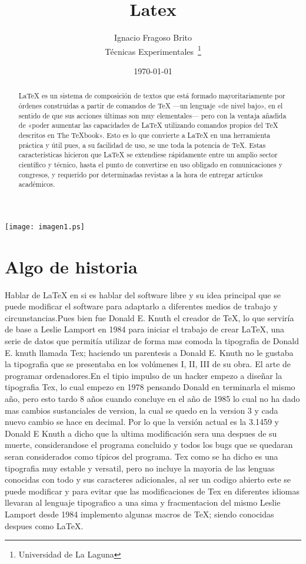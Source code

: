 \documentclass[a4paper,12pt]{article}
\begin{document}
\title{Latex}
\author{Ignacio Fragoso Brito\\
	Técnicas Experimentales~\footnote{Universidad de La Laguna}
	}
\date{\today}
\maketitle

\begin{abstract}
  LaTeX es un sistema de composición de textos que está formado mayoritariamente
  por órdenes construidas a partir de comandos de TeX —un lenguaje «de nivel bajo», 
  en el sentido de que sus acciones últimas son muy elementales— 
  pero con la ventaja añadida de «poder aumentar las capacidades de LaTeX utilizando
  comandos propios del TeX descritos en The TeXbook».
  Esto es lo que convierte a LaTeX en una herramienta práctica y útil pues, a su facilidad de uso,
  se une toda la potencia de TeX. Estas características hicieron que LaTeX se extendiese rápidamente
  entre un amplio sector científico y técnico, hasta el punto de convertirse en uso obligado en comunicaciones
  y congresos, y requerido por determinadas revistas a la hora de entregar artículos académicos.
\end{abstract}

\texttt{[image: imagen1.ps]}

\section{Algo de historia}
Hablar de LaTeX en si es hablar del software libre y su idea principal que se puede modificar el software 
para adaptarlo a diferentes medios de trabajo y circunstancias.Pues bien fue Donald E. Knuth el creador de TeX,
lo que serviría de base a Leslie Lamport en 1984 para iniciar el trabajo de crear LaTeX, una serie de datos
que permitía utilizar de forma mas comoda la tipografia de Donald E. knuth llamada Tex; haciendo un parentesis
a Donald E. Knuth no le gustaba la tipografia que se presentaba en los volúmenes I, II, III de su obra.
El arte de programar ordenadores.En el tipio impulso de un hacker empezo a diseñar la tipografia Tex, 
lo cual empezo en 1978 pensando Donald en terminarla el mismo año, pero esto tardo 8 años cuando concluye 
en el año de 1985 lo cual no ha dado mas cambios sustanciales de version, la cual se quedo en la version 3
y cada nuevo cambio se hace en decimal. Por lo que la versión actual es la 3.1459 y Donald E Knuth a dicho
que la ultima modificación sera  una despues de su muerte, considerandose el programa concluido y todos los
bugs que se quedaran seran considerados como típicos del programa. Tex como se ha dicho es una tipografia 
muy estable y versatil, pero no incluye la mayoria de las lenguas conocidas con todo y sus caracteres adicionales,
al ser un codigo abierto este se puede modificar y para evitar que las modificaciones de Tex en diferentes idiomas
llevaran al lenguaje tipografico a una sima y fracmentacion del mismo Leslie Lamport desde 1984 implemento algunas
macros de TeX; siendo conocidas despues como LaTeX.
\end{document}

